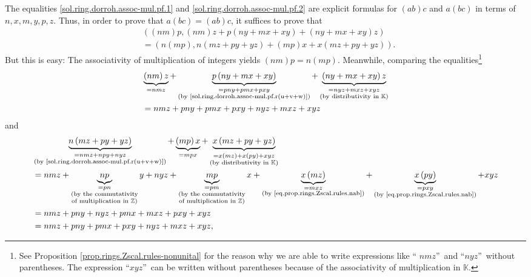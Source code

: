 \documentclass[paper=a4, fontsize=12pt]{scrartcl}%
\theoremstyle{plainsl}
\theoremstyle{definition}
\theoremstyle{remark}
\begin{document}
The equalities \eqref{sol.ring.dorroh.assoc-mul.pf.1} and
\eqref{sol.ring.dorroh.assoc-mul.pf.2} are explicit formulas for $\left(
ab\right)  c$ and $a\left(  bc\right)  $ in terms of $n,x,m,y,p,z$. Thus, in
order to prove that $a\left(  bc\right)  =\left(  ab\right)  c$, it suffices
to prove that
\begin{align*}
&  \left(  \left(  nm\right)  p,\left(  nm\right)  z+p\left(  ny+mx+xy\right)
+\left(  ny+mx+xy\right)  z\right) \\
&  =\left(  n\left(  mp\right)  ,n\left(  mz+py+yz\right)  +\left(  mp\right)
x+x\left(  mz+py+yz\right)  \right)  .
\end{align*}
But this is easy: The associativity of multiplication of integers yields
$\left(  nm\right)  p=n\left(  mp\right)  $. Meanwhile, comparing the
equalities\footnote{See Proposition \ref{prop.rings.Zscal.rules-nonunital} for
the reason why we are able to write expressions like \textquotedblleft%
$nmz$\textquotedblright\ and \textquotedblleft$nyz$\textquotedblright\ without
parentheses. The expression \textquotedblleft$xyz$\textquotedblright\ can be
written without parentheses because of the associativity of multiplication in
$\mathbb{K}$.}%
\begin{align*}
&  \underbrace{\left(  nm\right)  z}_{=nmz}+\underbrace{p\left(
ny+mx+xy\right)  }_{\substack{=pny+pmx+pxy\\\text{(by
\eqref{sol.ring.dorroh.assoc-mul.pf.r(u+v+w)})}}}+\underbrace{\left(
ny+mx+xy\right)  z}_{\substack{=nyz+mxz+xyz\\\text{(by distributivity in
}\mathbb{K}\text{)}}}\\
&  =nmz+pny+pmx+pxy+nyz+mxz+xyz
\end{align*}
and%
\begin{align*}
&  \underbrace{n\left(  mz+py+yz\right)  }_{\substack{=nmz+npy+nyz\\\text{(by
\eqref{sol.ring.dorroh.assoc-mul.pf.r(u+v+w)})}}}+\underbrace{\left(
mp\right)  x}_{=mpx}+\underbrace{x\left(  mz+py+yz\right)  }%
_{\substack{=x\left(  mz\right)  +x\left(  py\right)  +xyz\\\text{(by
distributivity in }\mathbb{K}\text{)}}}\\
&  =nmz+\underbrace{np}_{\substack{=pn\\\text{(by the commutativity}\\\text{of
multiplication in }\mathbb{Z}\text{)}}}y+nyz+\underbrace{mp}%
_{\substack{=pm\\\text{(by the commutativity}\\\text{of multiplication in
}\mathbb{Z}\text{)}}}x+\underbrace{x\left(  mz\right)  }%
_{\substack{=mxz\\\text{(by \eqref{eq.prop.rings.Zscal.rules.nab})}%
}}+\underbrace{x\left(  py\right)  }_{\substack{=pxy\\\text{(by
\eqref{eq.prop.rings.Zscal.rules.nab})}}}+xyz\\
&  =nmz+pny+nyz+pmx+mxz+pxy+xyz\\
&  =nmz+pny+pmx+pxy+nyz+mxz+xyz,
\end{align*}
\end{document}

